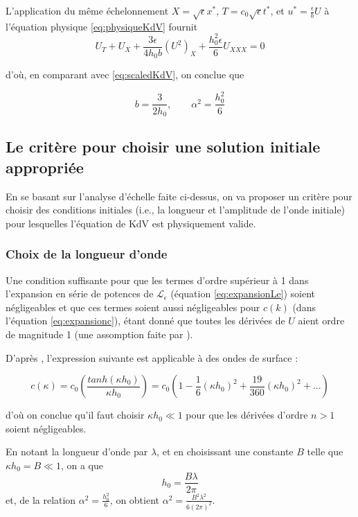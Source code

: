 \indent L'application du même échelonnement $ X=\sqrt{\epsilon}x^*$, $T =c_0 \sqrt{\epsilon} t^*$, et $u^* = \frac{\epsilon}{ b} U$ à l'équation physique \eqref{eq:physiqueKdV} fournit $$U_T + U_X + \frac{3\epsilon}{4h_0b} (U^2)_X + \frac{h_0^2\epsilon}{6}U_{XXX} = 0$$ 

\noindent d'où, en comparant avec  \eqref{eq:scaledKdV}, on conclue que 

\begin{equation}
\label{eq:analysisb}
b = \frac{3}{2h_0}, \qquad \alpha^2 = \frac{h_0^2}{6}
\end{equation} 


\subsection{Le critère pour choisir une solution initiale appropriée}

\indent En se basant sur l'analyse d'échelle faite ci-dessus, on va proposer un critère pour choisir des conditions initiales (i.e., la longueur et l'amplitude de l'onde initiale) pour lesquelles l'équation de KdV est physiquement valide. 

\subsubsection{Choix de la longueur d'onde}

\indent Une condition suffisante pour que les termes d'ordre supérieur à 1 dans l'expansion en série de potences de $\mathcal{L}_\epsilon$  (équation \ref{eq:expansionLe}) soient négligeables et que ces termes soient aussi négligeables pour $c(k)$ (dans l'équation \ref{eq:expansionc}), étant donné que toutes les dérivées de $U$ aient ordre de magnitude 1 (une assomption faite par \cite{BBM1971}).

\indent  D'après \cite{BBM1971}, l'expression suivante est applicable à des ondes de surface :

$$c(\kappa) = c_0 \left(\frac{tanh(\kappa h_0)}{\kappa h_0}\right) = c_0 \left(1 - \frac{1}{6}(\kappa h_0)^2 + \frac{19}{360}(\kappa h_0)^2 + ... \right) $$

\noindent d'où on conclue qu'il faut choisir $\kappa h_0 \ll 1$ pour que les dérivées d'ordre $n>1$ soient négligeables.

\indent En notant la longueur d'onde par $\lambda$, et en choisissant une constante $B$ telle que $\kappa h_0  =  B \ll 1$, on a que $$h_0 = \frac{B\lambda}{2\pi}$$ et, de la relation $\alpha^2 = \frac{h_0^2}{6}$, on obtient $\alpha^2 = \frac{B^2\lambda^2}{6(2\pi)^2}$.

